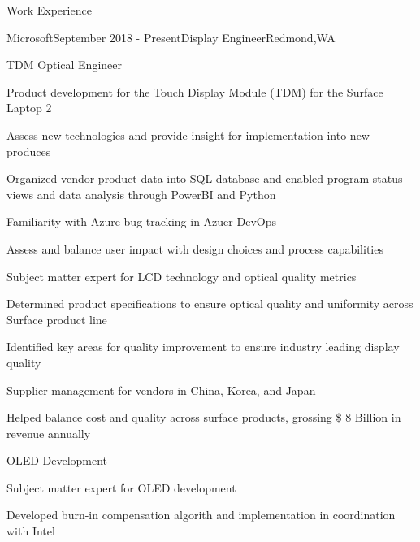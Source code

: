 \documentclass{resume} %
\begin{document}

\begin{rSection}{Work Experience}

\begin{rSubsection}{Microsoft}{September 2018 - Present}{Display Engineer}{Redmond,WA}
\begin{rSubsubsection}{TDM Optical Engineer}
\item Product development for the Touch Display Module (TDM) for the Surface Laptop 2 
\item Assess new technologies and provide insight for implementation into new produces
\item Organized vendor product data into SQL database and enabled program status views and data analysis through PowerBI and Python
\item Familiarity with Azure bug tracking in Azuer DevOps
\item Assess and balance user impact with design choices and process capabilities
\item Subject matter expert for LCD technology and optical quality metrics
\item Determined product specifications to ensure optical quality and uniformity across Surface product line
\item Identified key areas for quality improvement to ensure industry leading display quality
\item Supplier management for vendors in China, Korea, and Japan
\item Helped balance cost and quality across surface products, grossing \$ 8 Billion in revenue annually
\end{rSubsubsection}
\begin{rSubsubsection}{OLED Development}
\item Subject matter expert for OLED development
\item Developed burn-in compensation algorith and implementation in coordination with Intel
\end{rSubsubsection}
\end{rSubsection}
\end{rSection}
\end{document}

